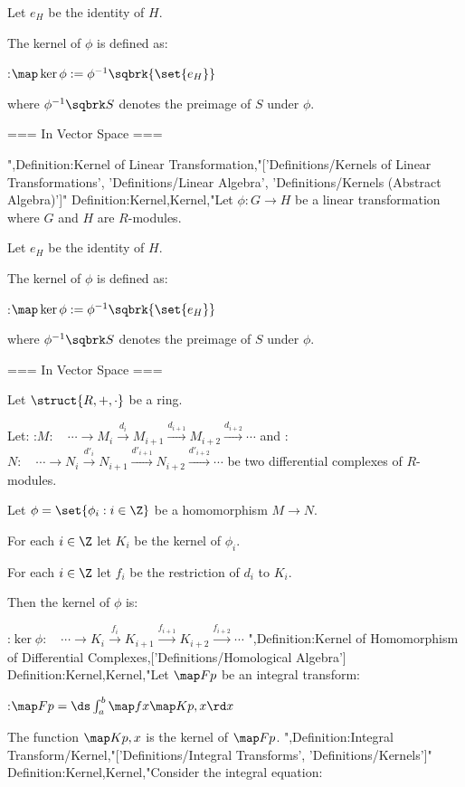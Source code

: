 Let $e_H$ be the identity of $H$.


The kernel of $\phi$ is defined as:

:$\map \ker \phi := \phi^{-1} \sqbrk {\set {e_H} }$

where $\phi^{-1} \sqbrk S$ denotes the preimage of $S$ under $\phi$.


=== In Vector Space ===

",Definition:Kernel of Linear Transformation,"['Definitions/Kernels of Linear Transformations', 'Definitions/Linear Algebra', 'Definitions/Kernels (Abstract Algebra)']"
Definition:Kernel,Kernel,"Let $\phi: G \to H$ be a linear transformation where $G$ and $H$ are $R$-modules.

Let $e_H$ be the identity of $H$.


The kernel of $\phi$ is defined as:

:$\map \ker \phi := \phi^{-1} \sqbrk {\set {e_H} }$

where $\phi^{-1} \sqbrk S$ denotes the preimage of $S$ under $\phi$.


=== In Vector Space ===

Let $\struct {R, +, \cdot}$ be a ring.

Let:
:$M: \quad \cdots \longrightarrow M_i \stackrel {d_i} \longrightarrow M_{i + 1} \stackrel {d_{i + 1} } \longrightarrow M_{i + 2} \stackrel {d_{i + 2} } \longrightarrow \cdots$
and
:$N: \quad \cdots \longrightarrow N_i \stackrel {d'_i} \longrightarrow N_{i + 1} \stackrel {d'_{i + 1} } \longrightarrow N_{i + 2} \stackrel {d'_{i + 2} } \longrightarrow \cdots$
be two differential complexes of $R$-modules.

Let $\phi = \set {\phi_i : i \in \Z}$ be a homomorphism $M \to N$.

For each $i \in \Z$ let $K_i$ be the kernel of $\phi_i$.

For each $i \in \Z$ let $f_i$ be the restriction of $d_i$ to $K_i$.


Then the kernel of $\phi$ is:

:$\ker \phi : \quad \cdots \longrightarrow K_i \stackrel {f_i} \longrightarrow K_{i + 1} \stackrel {f_{i + 1} } \longrightarrow K_{i + 2} \stackrel {f_{i + 2} } \longrightarrow \cdots$
",Definition:Kernel of Homomorphism of Differential Complexes,['Definitions/Homological Algebra']
Definition:Kernel,Kernel,"Let $\map F p$ be an integral transform:

:$\map F p = \ds \int_a^b \map f x \map K {p, x} \rd x$


The function $\map K {p, x}$ is the kernel of $\map F p$.
",Definition:Integral Transform/Kernel,"['Definitions/Integral Transforms', 'Definitions/Kernels']"
Definition:Kernel,Kernel,"Consider the integral equation:

